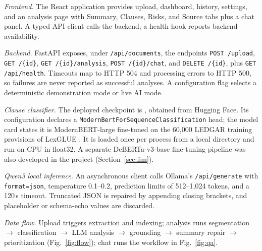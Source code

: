\documentclass[conference]{IEEEtran}
\begin{document}
\textit{Frontend.} The React application provides upload, dashboard, history, settings, and an analysis page with Summary, Clauses, Risks, and Source tabs plus a chat panel. A typed API client calls the backend; a health hook reports backend availability.

\textit{Backend.} FastAPI exposes, under \texttt{/api/documents}, the endpoints \texttt{POST /upload}, \texttt{GET /\{id\}}, \texttt{GET /\{id\}/analysis}, \texttt{POST /\{id\}/chat}, and \texttt{DELETE /\{id\}}, plus \texttt{GET /api/health}. Timeouts map to HTTP 504 and processing errors to HTTP 500, so failures are never reported as successful analyses. A configuration flag selects a deterministic demonstration mode or live AI mode.

\textit{Clause classifier.} The deployed checkpoint is , obtained from Hugging Face. Its configuration declares a \texttt{ModernBertForSequenceClassification} head; the model card states it is ModernBERT-large \cite{warner2024} fine-tuned on the 60{,}000 LEDGAR training provisions of LexGLUE \cite{chalkidis2022}. It is loaded once per process from a local directory and run on CPU in float32. A separate DeBERTa-v3-base \cite{he2023} fine-tuning pipeline was also developed in the project (Section~\ref{sec:lim}).

\textit{Qwen3 local inference.} An asynchronous client calls Ollama's \texttt{/api/generate} with \texttt{format=json}, temperature 0.1--0.2, prediction limits of 512--1{,}024 tokens, and a 120\,s timeout. Truncated JSON is repaired by appending closing brackets, and placeholder or schema-echo values are discarded.

\textit{Data flow.} Upload triggers extraction and indexing; analysis runs segmentation $\rightarrow$ classification $\rightarrow$ LLM analysis $\rightarrow$ grounding $\rightarrow$ summary repair $\rightarrow$ prioritization (Fig.~\ref{fig:flow}); chat runs the workflow in Fig.~\ref{fig:qa}.
\end{document}
